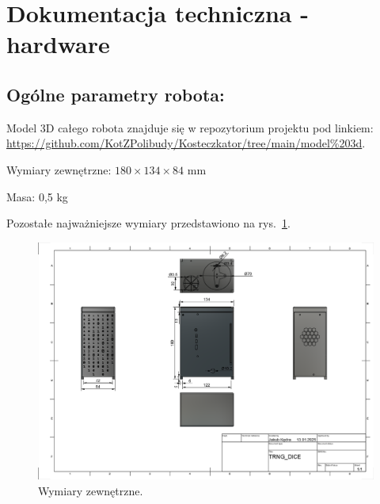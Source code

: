 \section{Dokumentacja techniczna - hardware}\label{sec:dokumentacja-techniczna}

\subsection{Ogólne parametry robota:}
Model 3D całego robota znajduje się w repozytorium projektu pod linkiem: \url{https://github.com/KotZPolibudy/Kosteczkator/tree/main/model%203d}.

Wymiary zewnętrzne: $180 \times 134 \times 84$ mm

Masa: 0,5 kg

Pozostałe najważniejsze wymiary przedstawiono na rys.~\ref{fig:wymiary}.
\begin{figure}[H]
    \centering
    \includegraphics[width=0.95\linewidth]{chapters/03-praca-wlasna/figures/wymiary}
    \caption{\label{fig:wymiary}Wymiary zewnętrzne.}
\end{figure}


